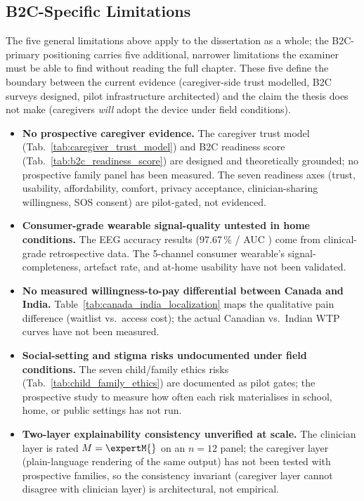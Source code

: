 \subsection{B2C-Specific Limitations}
\label{subsec:b2c_specific_limitations}

The five general limitations above apply to the dissertation as a whole; the B2C-primary positioning carries five additional, narrower limitations the examiner must be able to find without reading the full chapter. These five define the boundary between the current evidence (caregiver-side trust modelled, B2C surveys designed, pilot infrastructure architected) and the claim the thesis does not make (caregivers \emph{will} adopt the device under field conditions).

\begin{itemize}[leftmargin=*, itemsep=2pt]
    \item \textbf{No prospective caregiver evidence.} The caregiver trust model (Tab.~\ref{tab:caregiver_trust_model}) and B2C readiness score (Tab.~\ref{tab:b2c_readiness_score}) are designed and theoretically grounded; no prospective family panel has been measured. The seven readiness axes (trust, usability, affordability, comfort, privacy acceptance, clinician-sharing willingness, SOS consent) are pilot-gated, not evidenced.
    \item \textbf{Consumer-grade wearable signal-quality untested in home conditions.} The EEG accuracy results (97.67\,\% / AUC \aucval{}) come from clinical-grade retrospective data. The 5-channel consumer wearable's signal-completeness, artefact rate, and at-home usability have not been validated.
    \item \textbf{No measured willingness-to-pay differential between Canada and India.} Table~\ref{tab:canada_india_localization} maps the qualitative pain difference (waitlist vs.\ access cost); the actual Canadian vs.\ Indian WTP curves have not been measured.
    \item \textbf{Social-setting and stigma risks undocumented under field conditions.} The seven child/family ethics risks (Tab.~\ref{tab:child_family_ethics}) are documented as pilot gates; the prospective study to measure how often each risk materialises in school, home, or public settings has not run.
    \item \textbf{Two-layer explainability consistency unverified at scale.} The clinician layer is rated $M = \expertM{}$ on an $n = 12$ panel; the caregiver layer (plain-language rendering of the same output) has not been tested with prospective families, so the consistency invariant (caregiver layer cannot disagree with clinician layer) is architectural, not empirical.
\end{itemize}

